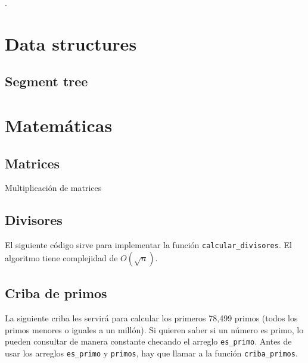 



\def\title{Tecnológico de Monterrey Campus Querétaro}
.\\[0.2cm]
\tableofcontents\newpage

\section{Data structures}
\subsection{Segment tree}

\section{Matemáticas}
\subsection{Matrices}
Multiplicación de matrices
\subsection{Divisores}
El siguiente código sirve para implementar la función \lstinline{calcular_divisores}. El algoritmo tiene complejidad de $O(\sqrt n)$.
\subsection{Criba de primos}
La siguiente criba les servirá para calcular los primeros 78,499 primos (todos los primos menores o iguales a un millón). Si quieren saber si un número es primo, lo pueden consultar de manera constante checando el arreglo \lstinline{es_primo}. Antes de usar los arreglos \lstinline{es_primo} y \lstinline{primos}, hay que llamar a la función \lstinline{criba_primos}.


